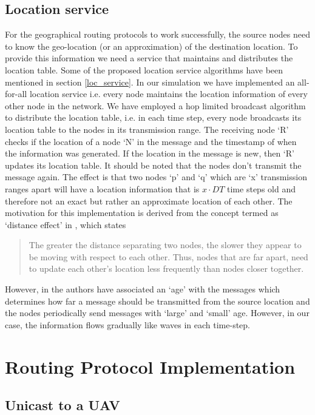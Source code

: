 \subsection{Location service} \label{loc_service_impl}

For the geographical routing protocols to work successfully, the source nodes need to know the geo-location (or an approximation) of the destination location. To provide this information we need a service that maintains and distributes the location table. Some of the proposed location service algorithms have been mentioned in section \ref{loc_service}. In our simulation we have implemented an all-for-all location service i.e. every node maintains the location information of every other node in the network. 
We have employed a hop limited broadcast algorithm to distribute the location table, i.e. in each time step, every node broadcasts its location table to the nodes in its transmission range. The receiving node `R' checks if the location of a node `N' in the message and the timestamp of when the information was generated. If the location in the message is new, then `R' updates its location table. It should be noted that the nodes don't transmit the message again.
The effect is that two nodes `p' and `q' which are `x' transmission ranges apart will have a location information that is $x \cdot DT $ time steps old and therefore not an exact but rather an approximate location of each other. The motivation for this implementation is derived from the concept termed as `distance effect’ in \cite{Basagni:1998:DRE:288235.288254}, which states
\begin{quotation}
The greater the distance separating two nodes, the slower they appear to be moving with respect to each other. Thus, nodes that are far apart, need to update each other’s location less frequently than nodes closer together.
\end{quotation}
However, in \cite{Basagni:1998:DRE:288235.288254} the authors have associated an `age' with the messages which determines how far a message should be transmitted from the source location and the nodes periodically send messages with `large' and `small' age. However, in our case, the information flows gradually like waves in each time-step.


\section{Routing Protocol Implementation}
\subsection{Unicast to a UAV}
